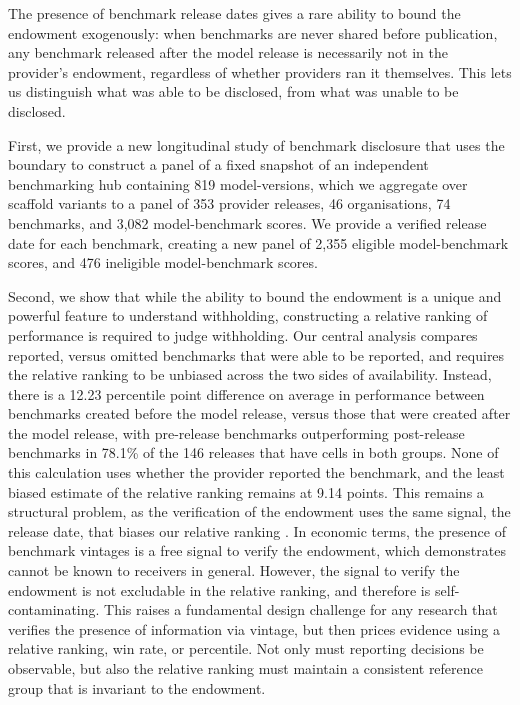\documentclass{article}
\begin{document}
The presence of benchmark release dates gives a rare ability to bound the endowment exogenously: when benchmarks are never shared before publication, any benchmark released after the model release is necessarily not in the provider's endowment, regardless of whether providers ran it themselves. This lets us distinguish what was able to be disclosed, from what was unable to be disclosed.

First, we provide a new longitudinal study of benchmark disclosure that uses the boundary to construct a panel of a fixed snapshot of an independent benchmarking hub containing 819 model-versions, which we aggregate over scaffold variants to a panel of 353 provider releases, 46 organisations, 74 benchmarks, and 3,082 model-benchmark scores. We provide a verified release date for each benchmark, creating a new panel of 2,355 eligible model-benchmark scores, and 476 ineligible model-benchmark scores.

Second, we show that while the ability to bound the endowment is a unique and powerful feature to understand withholding, constructing a relative ranking of performance is required to judge withholding. Our central analysis compares reported, versus omitted benchmarks that were able to be reported, and requires the relative ranking to be unbiased across the two sides of availability. Instead, there is a 12.23 percentile point difference on average in performance between benchmarks created before the model release, versus those that were created after the model release, with pre-release benchmarks outperforming post-release benchmarks in 78.1\% of the 146 releases that have cells in both groups. None of this calculation uses whether the provider reported the benchmark, and the least biased estimate of the relative ranking remains at 9.14 points. This remains a structural problem, as the verification of the endowment uses the same signal, the release date, that biases our relative ranking \citep{heckman1979}. In economic terms, the presence of benchmark vintages is a free signal to verify the endowment, which \citet{dye1985} demonstrates cannot be known to receivers in general. However, the signal to verify the endowment is not excludable in the relative ranking, and therefore is self-contaminating. This raises a fundamental design challenge for any research that verifies the presence of information via vintage, but then prices evidence using a relative ranking, win rate, or percentile. Not only must reporting decisions be observable, but also the relative ranking must maintain a consistent reference group that is invariant to the endowment.
\end{document}

